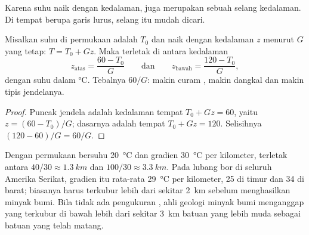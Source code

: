 Karena suhu naik dengan kedalaman,  juga merupakan sebuah selang
kedalaman. Di tempat  berupa garis lurus, selang itu mudah dicari.

\begin{proposition}\label{prop:g11:fossil-fuel-geology:window-depth}
Misalkan suhu di permukaan adalah $T_0$ dan naik dengan kedalaman $z$ menurut
 $G$ yang tetap: $T = T_0 + G z$. Maka  terletak
di antara kedalaman
\[
  z_{\text{atas}} = \frac{60 - T_0}{G}
  \qquad\text{dan}\qquad
  z_{\text{bawah}} = \frac{120 - T_0}{G},
\]
dengan suhu dalam \unit{\degreeCelsius}. Tebalnya $60/G$: makin curam ,
makin dangkal dan makin tipis jendelanya.
\end{proposition}

\begin{proof}
Puncak jendela adalah kedalaman tempat $T_0 + G z = 60$, yaitu
$z = (60 - T_0)/G$; dasarnya adalah tempat $T_0 + G z = 120$. Selisihnya
$(120 - 60)/G = 60/G$.
\end{proof}

Dengan permukaan bersuhu \qty{20}{\degreeCelsius} dan gradien
\qty{30}{\degreeCelsius} per kilometer,  terletak antara
$40/30 \approx \qty{1.3}{km}$ dan $100/30 \approx \qty{3.3}{km}$. Pada lubang
bor di seluruh Amerika Serikat, gradien itu rata-rata
\qty{29}{\degreeCelsius} per kilometer, \num{25} di timur dan \num{34}
di barat;  biasanya harus terkubur lebih dari sekitar
\qty{2}{km} sebelum menghasilkan minyak bumi. Bila tidak ada pengukuran
, ahli geologi minyak bumi menganggap  yang terkubur di bawah
lebih dari sekitar \qty{3}{km} batuan yang lebih muda sebagai batuan yang telah
matang.

